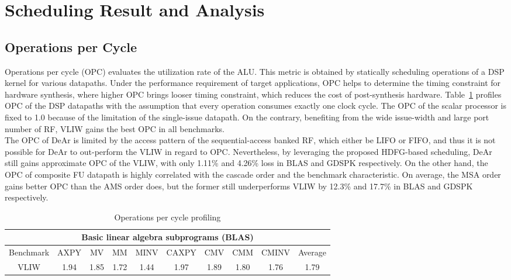 \section{Scheduling Result and Analysis}
{
    \subsection{Operations per Cycle}
    Operations per cycle (OPC) evaluates the utilization rate of the ALU.
    This metric is obtained by statically scheduling operations of a DSP kernel for various datapaths.
    Under the performance requirement of target applications, OPC helps to determine the timing constraint for hardware synthesis, 
    where higher OPC brings looser timing constraint, which reduces the cost of post-synthesis hardware.
    Table~\ref{tab:opc} profiles OPC of the DSP datapaths with the assumption that every operation consumes exactly one clock cycle.
    The OPC of the scalar processor is fixed to 1.0 because of the limitation of the single-issue datapath.
    On the contrary, benefiting from the wide issue-width and large port number of RF, VLIW gains the best OPC in all benchmarks.
    \\\indent
    The OPC of DeAr is limited by the access pattern of the sequential-access banked RF, which either be LIFO or FIFO, 
    and thus it is not possible for DeAr to out-perform the VLIW in regard to OPC.
    Nevertheless, by leveraging the proposed HDFG-based scheduling,  
    DeAr still gains approximate OPC of the VLIW, with only 1.11\% and 4.26\% loss in BLAS and GDSPK respectively.
    On the other hand, the OPC of composite FU datapath is highly correlated with the cascade order and the benchmark characteristic. 
    On average, the MSA order gains better OPC than the AMS order does, 
    but the former still underperforms VLIW by 12.3\% and 17.7\% in BLAS and GDSPK respectively.
    \begin{table}[!ht]
        \centering
        \caption{Operations per cycle profiling}
        \label{tab:opc}
        \resizebox{\columnwidth}{!}
        {
            \begin{tabular}{|c|c|c|c|c|c|c|c|c|c|}
                \hline
                \multicolumn{10}{|c|}{\textbf{Basic linear algebra subprograms (BLAS)}} \\ \hline
                Benchmark  &  AXPY  &  MV  &  MM  &  MINV  &  CAXPY  &  CMV  &  CMM  &  CMINV  &  Average \\ \hline 
                VLIW  &   1.94  &   1.85  &   1.72  &   1.44  &   1.97  &   1.89  &   1.80  &   1.76  &   1.79     \\ \hline 

\end{tabular}}
\end{table}}
